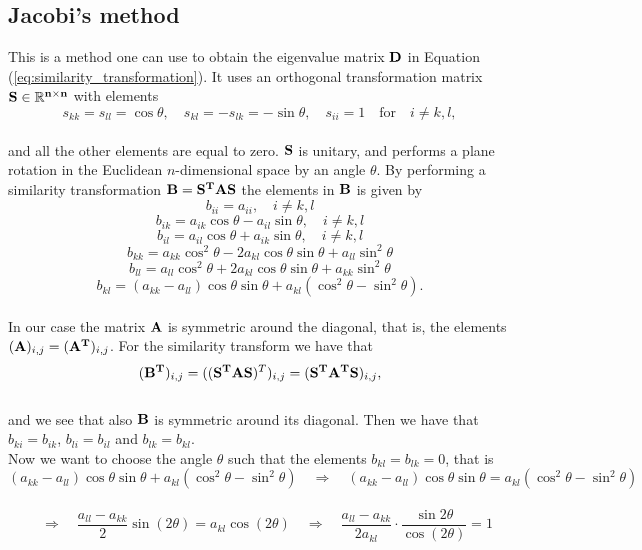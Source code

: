 \documentclass[12pt]{article}
\begin{document}
\begin{flushleft}
\subsection{Jacobi's method}
This is a method one can use to obtain the eigenvalue matrix $\bf D$ in Equation (\ref{eq:similarity_transformation}). It uses an orthogonal transformation matrix $\bf S\in\mathbb{R}^{n\times n}$ with elements\\
\vspace{5mm}
$$s_{kk} = s_{ll} = \cos\theta, \quad s_{kl} = -s_{lk} = -\sin\theta, \quad s_{ii} = 1\quad\text{for}\quad i\neq k,l,$$\\
\vspace{5mm}
and all the other elements are equal to zero. $\bf S$ is unitary, and performs a plane rotation in the Euclidean $n$-dimensional space by an angle $\theta$. By performing a similarity transformation $\bf B=S^T AS$ the elements in $\bf B$ is given by\\
\vspace{5mm}
$$b_{ii} = a_{ii},\quad i\neq k,l$$
$$b_{ik} = a_{ik}\cos\theta - a_{il}\sin\theta,\quad i\neq k,l$$
$$b_{il} = a_{il}\cos\theta + a_{ik}\sin\theta,\quad i\neq k,l$$
$$b_{kk} = a_{kk}\cos^2\theta - 2a_{kl}\cos\theta\sin\theta + a_{ll}\sin^2\theta$$
$$b_{ll} = a_{ll}\cos^2\theta + 2a_{kl}\cos\theta\sin\theta + a_{kk}\sin^2\theta$$
$$b_{kl} = (a_{kk}-a_{ll})\cos\theta\sin\theta + a_{kl}(\cos^2\theta - \sin^2\theta).$$\\
\vspace{5mm}
In our case the matrix $\bf A$ is symmetric around the diagonal, that is, the elements $ ({\bf A})_{i,j} = ({\bf A^T})_{i,j}$. For the similarity transform we have that\\
\vspace{5mm}
$$({\bf B^T})_{i,j} = (({\bf S^T AS})^T)_{i,j} = ({\bf S^TA^TS})_{i,j},$$\\
\vspace{5mm} 
and we see that also $\bf B$ is symmetric around its diagonal. Then we have that $b_{ki} = b_{ik}$, $b_{li} = b_{il}$ and $b_{lk} = b_{kl}$.\\
\vspace{5mm}
Now we want to choose the angle $\theta$ such that the elements $b_{kl}=b_{lk}=0$, that is\\
$$(a_{kk}-a_{ll})\cos\theta\sin\theta + a_{kl}(\cos^2\theta - \sin^2\theta) \quad\Rightarrow\quad (a_{kk}-a_{ll})\cos\theta\sin\theta = a_{kl}(\cos^2\theta - \sin^2\theta)$$\\
$$\quad\Rightarrow\quad \frac{a_{ll}-a_{kk}}{2}\sin(2\theta) = a_{kl}\cos(2\theta)\quad\Rightarrow\quad \frac{a_{ll}-a_{kk}}{2a_{kl}}\cdot \frac{\sin{2\theta}}{\cos(2\theta)} = 1$$\\

\end{flushleft}
\end{document}
